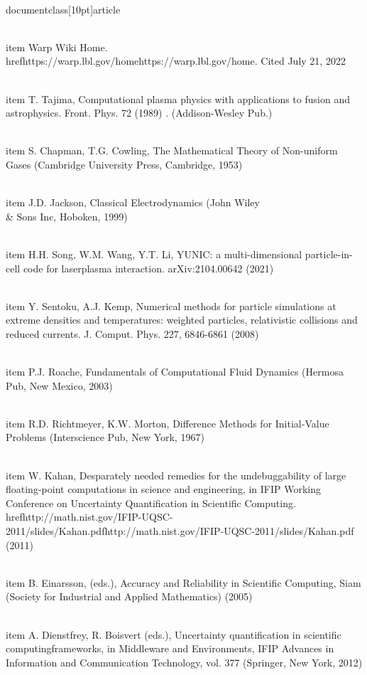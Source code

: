 \\documentclass[10pt]{article}
\begin{document}
  \\item Warp Wiki Home. \\href{https://warp.lbl.gov/home}{https://warp.lbl.gov/home}. Cited July 21, 2022

  \\item T. Tajima, Computational plasma physics with applications to fusion and astrophysics. Front. Phys. 72 (1989) . (Addison-Wesley Pub.)

  \\item S. Chapman, T.G. Cowling, The Mathematical Theory of Non-uniform Gases (Cambridge University Press, Cambridge, 1953)

  \\item J.D. Jackson, Classical Electrodynamics (John Wiley \\& Sons Inc, Hoboken, 1999)

  \\item H.H. Song, W.M. Wang, Y.T. Li, YUNIC: a multi-dimensional particle-in-cell code for laserplasma interaction. arXiv:2104.00642 (2021)

  \\item Y. Sentoku, A.J. Kemp, Numerical methods for particle simulations at extreme densities and temperatures: weighted particles, relativistic collisions and reduced currents. J. Comput. Phys. 227, 6846-6861 (2008)

  \\item P.J. Roache, Fundamentals of Computational Fluid Dynamics (Hermosa Pub, New Mexico, 2003)

  \\item R.D. Richtmeyer, K.W. Morton, Difference Methods for Initial-Value Problems (Interscience Pub, New York, 1967)

  \\item W. Kahan, Desparately needed remedies for the undebuggability of large floating-point computations in science and engineering, in IFIP Working Conference on Uncertainty Quantification in Scientific Computing. \\href{http://math.nist.gov/IFIP-UQSC-2011/slides/Kahan.pdf}{http://math.nist.gov/IFIP-UQSC-2011/slides/Kahan.pdf} (2011)

  \\item B. Einarsson, (eds.), Accuracy and Reliability in Scientific Computing, Siam (Society for Industrial and Applied Mathematics) (2005)

  \\item A. Dienstfrey, R. Boisvert (eds.), Uncertainty quantification in scientific computingframeworks, in Middleware and Environments, IFIP Advances in Information and Communication Technology, vol. 377 (Springer, New York, 2012)
\end{document}
